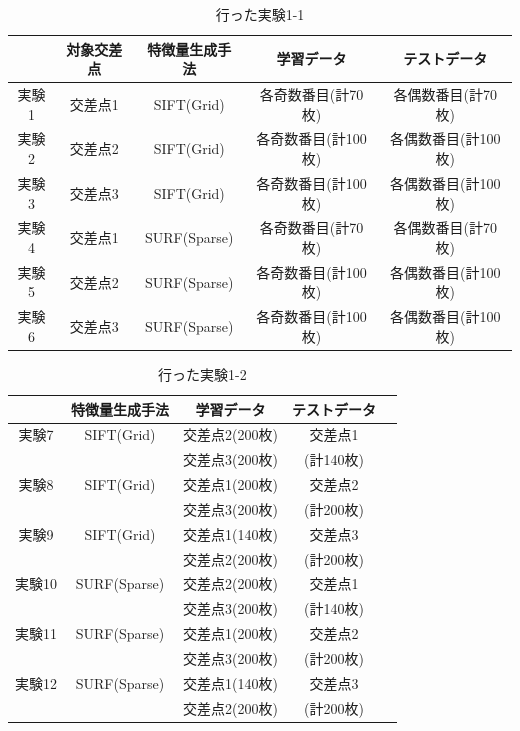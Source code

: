 \begin{table}[htbp]
  \begin{center}
    \caption{行った実験1-1}
    \begin{tabular}{|c||c|c|c|c|} \hline
      & 対象交差点 & 特徴量生成手法 & 学習データ & テストデータ \\ \hline \hline
      実験1 & 交差点1 & SIFT(Grid) & 各奇数番目(計70枚) & 各偶数番目(計70枚) \\ \hline
      実験2 & 交差点2 & SIFT(Grid) & 各奇数番目(計100枚) & 各偶数番目(計100枚) \\ \hline
      実験3 & 交差点3 & SIFT(Grid) & 各奇数番目(計100枚) & 各偶数番目(計100枚) \\ \hline
      実験4 & 交差点1 & SURF(Sparse) & 各奇数番目(計70枚) & 各偶数番目(計70枚) \\ \hline
      実験5 & 交差点2 & SURF(Sparse) & 各奇数番目(計100枚) & 各偶数番目(計100枚) \\ \hline
      実験6 & 交差点3 & SURF(Sparse) & 各奇数番目(計100枚) & 各偶数番目(計100枚) \\ \hline
      \end{tabular}
    \label{tb:experiment1-1}
  \end{center}
\end{table}

\begin{table}[htbp]
  \begin{center}
    \caption{行った実験1-2}
    \begin{tabular}{|c||c|c|c|c|} \hline
      & 特徴量生成手法 & 学習データ & テストデータ \\ \hline \hline
      実験7 & SIFT(Grid) & 交差点2(200枚) & 交差点1 \\ 
       &  & 交差点3(200枚) & (計140枚) \\ \hline
      実験8 & SIFT(Grid) & 交差点1(200枚) & 交差点2 \\
       &  & 交差点3(200枚) & (計200枚) \\ \hline
      実験9 & SIFT(Grid) & 交差点1(140枚) & 交差点3 \\ 
       &  & 交差点2(200枚) & (計200枚) \\ \hline
      実験10 & SURF(Sparse) & 交差点2(200枚) & 交差点1 \\ 
       &  & 交差点3(200枚) & (計140枚) \\ \hline
      実験11 & SURF(Sparse) & 交差点1(200枚) & 交差点2 \\ 
       &  & 交差点3(200枚) & (計200枚) \\ \hline
      実験12 & SURF(Sparse) & 交差点1(140枚) & 交差点3 \\ 
       &  & 交差点2(200枚) & (計200枚) \\ \hline
      \end{tabular}
    \label{tb:experiment1-2}
  \end{center}
\end{table}

